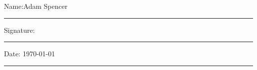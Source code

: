 \documentclass[11pt,oneside]{book}
\begin{document}
\noindent Name:\quad Adam Spencer\\[1mm]
\rule[1em]{25em}{0.5pt}

\noindent Signature:\\[1mm]
\rule[1em]{25em}{0.5pt}

\noindent Date: \quad \today\\[1mm]
\rule[1em]{25em}{0.5pt}





\tableofcontents
\listoffigures
\listoftables


\mainmatter









 
 

\begin{appendices}


\end{appendices}
\end{document}
